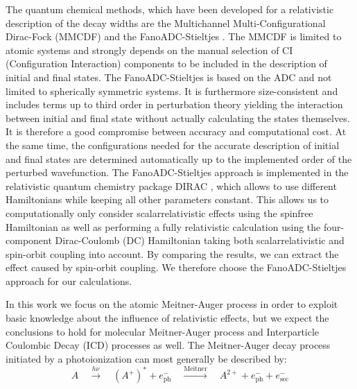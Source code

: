 \documentclass[aps,amssymb,preprint,a4paper]{revtex4}
\begin{document}
The quantum chemical methods, which have been developed for a relativistic
description of the decay widths are the Multichannel Multi-Configurational
Dirac-Fock (MMCDF) \cite{Fritzsche11} and the FanoADC-Stieltjes \cite{Fasshauer15_1}.
The MMCDF is limited to atomic systems and strongly depends on
the manual selection of CI (Configuration
Interaction) components to be included in the description of initial and      
final states.
The FanoADC-Stieltjes is based on the ADC and not limited to spherically symmetric
systems.
It is furthermore size-consistent and includes terms up to third order
in perturbation theory yielding the interaction between initial and final state
without actually calculating the states themselves.
It is therefore a good compromise between
accuracy and computational cost. At the same time, the configurations needed for the
accurate description of initial and final states are determined automatically up to
the implemented order of the perturbed wavefunction.
The FanoADC-Stieltjes approach is implemented in the relativistic
quantum chemistry package
DIRAC \cite{DIRAC17}, which allows to use different Hamiltonians while keeping
all other parameters constant. This allows us to computationally only consider
scalarrelativistic effects using the spinfree Hamiltonian as well as
performing a fully relativistic calculation using the four-component
Dirac-Coulomb (DC) Hamiltonian taking both scalarrelativistic and
spin-orbit coupling into account.
By comparing the results, we can extract the effect caused by spin-orbit coupling.
We therefore choose the FanoADC-Stieltjes approach for our calculations.


In this work we focus on the atomic Meitner-Auger process     
in order                                      
to exploit basic knowledge about the influence of relativistic effects,
but we expect the conclusions to hold for molecular Meitner-Auger process and
Interparticle Coulombic Decay (ICD) processes
\cite{Cederbaum97,Marburger03,Hergenhahn11,Jahnke15} as well.
The Meitner-Auger decay process initiated by a photoionization
can most generally be described by:
\begin{equation*}                                               
 A \quad \xrightarrow{h\nu}\quad (A^+)^* + e^-_\text{ph} \quad       
    \xrightarrow{\text{Meitner}} \quad A^{2+} + e^-_\text{ph} + e^-_\text{sec}     
\end{equation*}                                                 
                                                                
\end{document}
